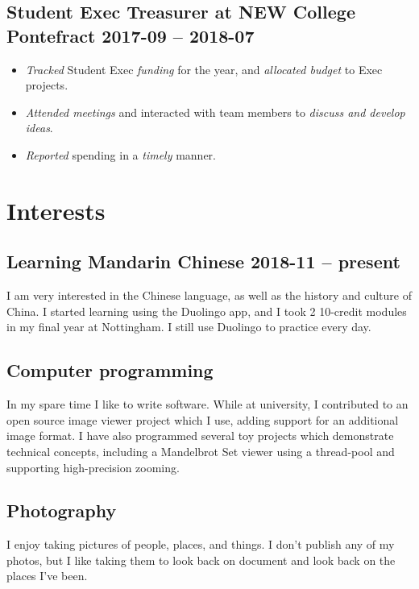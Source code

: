     \subsection{Student Exec Treasurer at NEW College Pontefract
    \hfill 2017-09 -- 2018-07}
        \begin{itemize}
            \item \emph{Tracked} Student Exec \emph{funding} for the year,
                and \emph{allocated budget} to Exec projects.
            \item \emph{Attended
                meetings} and interacted with team members to
                \emph{discuss and develop ideas}.
            \item \emph{Reported} spending in a \emph{timely} manner.
        \end{itemize}

\section{Interests}
\subsection{Learning Mandarin Chinese \hfill 2018-11 -- present}
I am very interested in the Chinese language, as well as the history and
culture of China. I started learning using the Duolingo app, and I took 2
10-credit modules in my final year  at Nottingham. I still use Duolingo to
practice every day.

\subsection{Computer programming}
In my spare time I like to write software. While at university, I contributed
to an open source image viewer project which I use, adding support for an
additional image format. I have also programmed several toy projects which
demonstrate technical concepts, including a Mandelbrot Set viewer using a
thread-pool and supporting high-precision zooming.

\subsection{Photography}
I enjoy taking pictures of people, places, and things. I don't publish any of
my photos, but I like taking them to look back on document and look back on the
places I've been.


